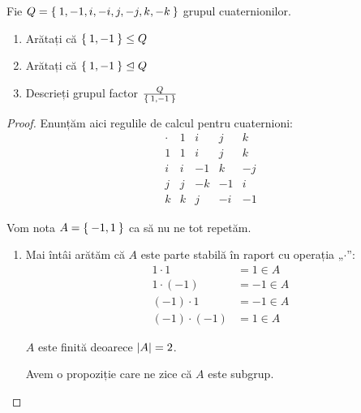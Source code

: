 \begin{exercise}
Fie \(Q = \Set{ 1, -1, i, -i, j, -j, k, -k }\) grupul cuaternionilor.
\begin{enumerate}
    \item Arătați că \(\Set{ 1, -1 } \leq Q\)
    \item Arătați că \(\Set{ 1, -1 } \trianglelefteq Q\)
    \item Descrieți grupul factor \(\frac{Q}{\Set{ 1, -1 }}\)
\end{enumerate}
\end{exercise}
\begin{proof}
Enunțăm aici regulile de calcul pentru cuaternioni:
\[
\begin{array}{c|c|c|c|c}
    \cdot & 1 & i & j & k \\
    \hline
    1 & 1 & i & j & k \\
    \hline
    i & i & -1 & k & -j \\
    \hline
    j & j & -k & -1 & i \\
    \hline
    k & k & j & -i & -1
\end{array}
\]

Vom nota \(A = \Set{ -1, 1 }\) ca să nu ne tot repetăm.
\begin{enumerate}
    \item Mai întâi arătăm că \(A\) este parte stabilă în raport cu operația „\(\cdot\)”:
    \begin{align*}
        1 \cdot 1 &= 1 \in A \\
        1 \cdot (-1) &= -1 \in A \\
        (-1) \cdot 1 &= -1 \in A \\
        (-1) \cdot (-1) &= 1 \in A
    \end{align*}

    \(A\) este finită deoarece \(\left\lvert A \right\rvert = 2\).

    Avem o propoziție care ne zice că \(A\) este subgrup.


\end{enumerate}
\end{proof}
